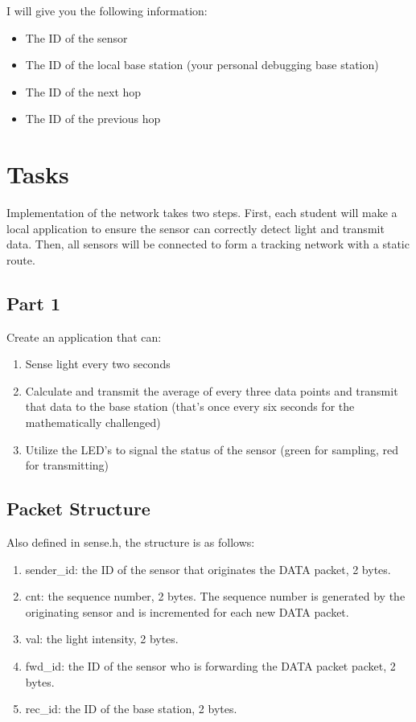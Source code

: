 \documentclass[letterpaper,12pt]{article}
\begin{document}
I will give you the following information:
\begin{itemize}
    \item The ID of the sensor
    \item The ID of the local base station (your personal debugging base station)
    \item The ID of the next hop
    \item The ID of the previous hop
\end{itemize}

\section*{Tasks}
Implementation of the network takes two steps. First, each student will make a
local application to ensure the sensor can correctly detect light and transmit
data. Then, all sensors will be connected to form a tracking network with a static route.

\subsection*{Part 1}
Create an application that can:
\begin{enumerate}
    \item Sense light every two seconds
    \item Calculate and transmit the average of every three data points and transmit
        that data to the base station (that's once every six seconds for the mathematically
        challenged)
    \item Utilize the LED's to signal the status of the sensor (green for sampling,
        red for transmitting)
\end{enumerate}

\subsection*{Packet Structure}
Also defined in sense.h, the structure is as follows:
\begin{enumerate}
    \item sender_id: the ID of the sensor that originates the DATA packet, 2 bytes.
    \item cnt: the sequence number, 2 bytes. The sequence number is generated by the
        originating sensor and is incremented for each new DATA packet.
    \item val: the light intensity, 2 bytes.
    \item fwd_id: the ID of the sensor who is forwarding the DATA packet packet, 2 bytes.
    \item rec_id: the ID of the base station, 2 bytes.
\end{enumerate}
\end{document}
